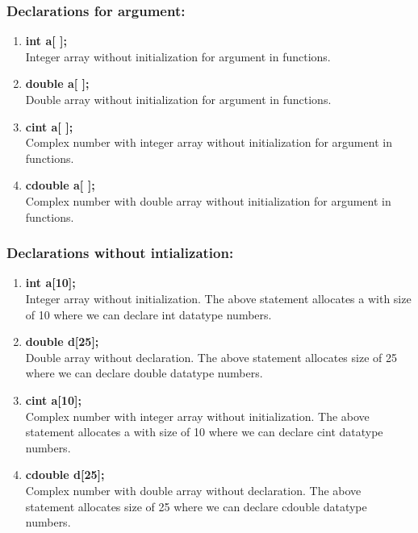 \documentclass[12pt]{article}
\begin{document}
\subsubsection{Declarations for argument:}
\begin{enumerate}
    \item \textbf{int a[ ];}\\
    Integer array without initialization for argument in functions.
    \item \textbf{double a[ ];}\\
    Double array without initialization for argument in functions.
    \item \textbf{cint a[ ];}\\
    Complex number with integer array without initialization for argument in functions.
    \item \textbf{cdouble a[ ];}\\
    Complex number with double array without initialization for argument in functions.
\end{enumerate}
\subsubsection{Declarations without intialization:}
\begin{enumerate}
    \item \textbf{int a[10];}\\
    Integer array without initialization.
    The above statement allocates a with size of 10 where we can declare int datatype numbers.
    \item \textbf{double d[25]; } \\
    Double array without declaration.
    The above statement allocates size of 25 where we can declare double datatype numbers.
    \item \textbf{cint a[10];}\\
    Complex number with integer array without initialization.
    The above statement allocates a with size of 10 where we can declare cint datatype numbers.
    \item \textbf{cdouble d[25]; } \\
    Complex number with double array without declaration.
    The above statement allocates size of 25 where we can declare cdouble datatype numbers.
\end{enumerate}
\end{document}
